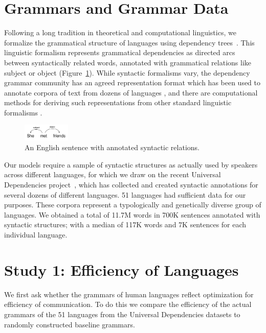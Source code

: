 \documentclass[9pt,twocolumn,twoside,lineno]{pnas-new}
\begin{document}
\section*{Grammars and Grammar Data}

Following a long tradition in theoretical and computational linguistics, we formalize  the grammatical structure of languages using dependency trees~\cite{hays1964dependency,hudson1984word,melcuk1988dependency,corbett1993heads,tesniere2015elements}.
This linguistic formalism represents grammatical dependencies as directed arcs between syntactically related words, annotated with grammatical relations like subject or object (Figure~\ref{fig:sent-dep}).
While syntactic formalisms vary, the dependency grammar community has an agreed representation format  which has been used to  annotate corpora of text from dozens of languages \cite{ud2.1}, and there are 
computational methods for deriving such representations from other standard linguistic formalisms \cite{boston2009dependency}.

\begin{figure}[ht]
    \centering
    \includegraphics[width=0.2\textwidth]{figure2.pdf}
	\caption{An English sentence with annotated syntactic relations.}
	\label{fig:sent-dep}
\end{figure}

Our models require a sample of syntactic structures as actually used by speakers across different languages, for which we draw on the recent
Universal Dependencies project~\cite{ud2.1}, which has collected and created syntactic annotations for several dozens of different languages.
51 languages had sufficient data for our purposes. 
These corpora represent a typologically and genetically diverse group of languages. %
We obtained a total of 11.7M words in 700K sentences annotated with syntactic structures; with a median of 117K words and 7K sentences for each individual language.



\section*{Study 1: Efficiency of Languages}
\label{sec:relative-efficiency}

We first ask whether the grammars of human languages reflect optimization for efficiency of communication.  To do this we
compare the efficiency of the actual grammars of the 51 languages from the Universal Dependencies datasets to randomly constructed baseline grammars.
 
\end{document}
